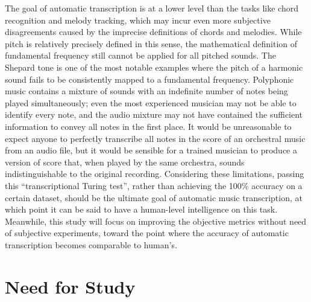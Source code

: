 The goal of automatic transcription is at a lower level than the tasks like chord recognition and melody tracking, which may incur even more subjective disagreements caused by the imprecise definitions of chords and melodies.
While pitch is relatively precisely defined in this sense, the mathematical definition of fundamental frequency still cannot be applied for all pitched sounds.
The Shepard tone \cite{shepard1964circularity} is one of the most notable examples where the pitch of a harmonic sound fails to be consistently mapped to a fundamental frequency.
Polyphonic music contains a mixture of sounds with an indefinite number of notes being played simultaneously; even the most experienced musician may not be able to identify every note, and the audio mixture may not have contained the sufficient information to convey all notes in the first place.
It would be unreasonable to expect anyone to perfectly transcribe all notes in the score of an orchestral music from an audio file, but it would be sensible for a trained musician to produce a version of score that, when played by the same orchestra, sounds indistinguishable to the original recording.
Considering these limitations, passing this ``transcriptional Turing test'', rather than achieving the 100\% accuracy on a certain dataset, should be the ultimate goal of automatic music transcription, at which point it can be said to have a human-level intelligence on this task.
Meanwhile, this study will focus on improving the objective metrics without need of subjective experiments, toward the point where the accuracy of automatic transcription becomes comparable to human's.



\section{Need for Study}

